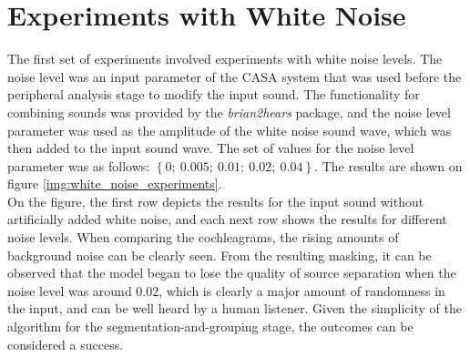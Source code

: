 \section{Experiments with White Noise}

The first set of experiments involved experiments with white noise levels. The noise level was an input parameter of the CASA system that was used before the peripheral analysis stage to modify the input sound. The functionality for combining sounds was provided by the \textit{brian2hears} \cite{brian2hears} package, and the noise level parameter was used as the amplitude of the white noise sound wave, which was then added to the input sound wave. The set of values for the noise level parameter was as follows: $\left\{0;~0.005;~0.01;~0.02;~0.04\right\}$. The results are shown on figure \ref{img:white_noise_experiments}.\\

On the figure, the first row depicts the results for the input sound without artificially added white noise, and each next row shows the results for different noise levels. When comparing the cochleagrams, the rising amounts of background noise can be clearly seen. From the resulting masking, it can be observed that the model began to lose the quality of source separation when the noise level was around $0.02$, which is clearly a major amount of randomness in the input, and can be well heard by a human listener. Given the simplicity of the algorithm for the segmentation-and-grouping stage, the outcomes can be considered a success.

